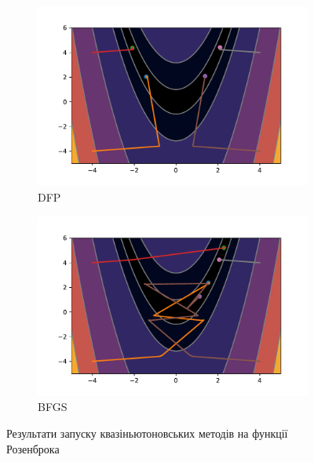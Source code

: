 \begin{figure}[h!]
\begin{subfigure}{0.5\textwidth}
        \includegraphics[width=\textwidth, trim=1cm 0.5cm 1.3cm 1cm, clip]{assets/DFP/rosenbrock.pdf}
        \caption{DFP}
    \end{subfigure}
    \begin{subfigure}{0.5\textwidth}
        \includegraphics[width=\textwidth, trim=1cm 0.5cm 1.3cm 1cm, clip]{assets/BFGS/rosenbrock.pdf}
        \caption{BFGS}
    \end{subfigure}
    \caption{Результати запуску квазіньютоновських методів на функції Розенброка}
\end{figure}

